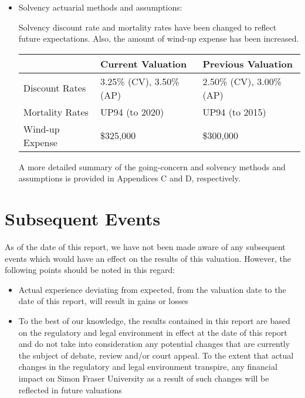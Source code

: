 \documentclass{report}
\begin{document}
\begin{itemize}
\vspace{3mm}
\item Solvency actuarial methods and assumptions:

Solvency discount rate and mortality rates have been changed to reflect future expectations. Also, the amount of wind-up expense has been increased.

\vspace{3mm}
\bgroup
\normalsize
\def\arraystretch{1.5}
\begin{tabular}{p{4.5cm} p{5cm}  p{5cm}}
\hline
& Current Valuation & Previous Valuation \\ \hline
Discount Rates & 3.25\% (CV), 3.50\% (AP) & 2.50\% (CV), 3.00\% (AP) \\ \hline
Mortality Rates & UP94 (to 2020) & UP94 (to 2015) \\ \hline
Wind-up Expense & \$325,000 & \$300,000 \\ \hline
\end{tabular}
\egroup

\vspace{3mm}
A more detailed summary of the going-concern and solvency methods and assumptions is provided in Appendices C and D, respectively.
\end{itemize}

\section{Subsequent Events}
As of the date of this report, we have not been made aware of any subsequent events which would have an effect on the results of this valuation. However, the following points should be noted in this regard:
\begin{itemize}
\item Actual experience deviating from expected, from the valuation date to the date of this report, will result in gains or losses
\item To the best of our knowledge, the results contained in this report are based on the regulatory and legal environment in effect at the date of this report and do not take into consideration any potential changes that are currently the subject of debate, review and/or court appeal. To the extent that actual changes in the regulatory and legal environment transpire, any financial impact on Simon Fraser University as a result of such changes will be reflected in future valuations
\end{itemize}

\end{document}
